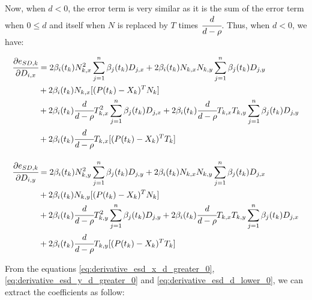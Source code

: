 \documentclass{article}
\begin{document}
Now, when $d < 0$, the error term is very similar as it is the sum of the error term when $0 \leq d$ and itself when $N$ is replaced by $T$ times $\cfrac{d}{d-\rho}$. Thus, when $d < 0$, we have:

\begin{equation}
\label{eq:derivative_esd_d_lower_0}
    \begin{aligned}
        \cfrac{\partial e_{SD,k}}{\partial D_{i,x}} 
        & = 2\beta_i(t_k)N_{k,x}^2 \sum \limits_{j=1}^{n} \beta_j(t_k)D_{j,x} 
        + 2\beta_i(t_k)N_{k,x}N_{k,y} \sum \limits_{j=1}^{n} \beta_j(t_k)D_{j,y} \\
        & + 2\beta_i(t_k)N_{k,x} [(P(t_k)-X_k)^T N_k] \\
        & + 2\beta_i(t_k) \cfrac{d}{d-\rho} T_{k,x}^2 \sum \limits_{j=1}^{n} \beta_j(t_k)D_{j,x} 
        + 2\beta_i(t_k) \cfrac{d}{d-\rho} T_{k,x}T_{k,y} \sum \limits_{j=1}^{n} \beta_j(t_k)D_{j,y} \\
        & + 2\beta_i(t_k) \cfrac{d}{d-\rho} T_{k,x} [(P(t_k)-X_k)^T T_k] 
        \\[10pt]
        \cfrac{\partial e_{SD,k}}{\partial D_{i,y}} 
        & = 2\beta_i(t_k)N_{k,y}^2 \sum \limits_{j=1}^{n} \beta_j(t_k)D_{j,y} 
        + 2\beta_i(t_k)N_{k,x}N_{k,y} \sum \limits_{j=1}^{n} \beta_j(t_k)D_{j,x} \\
        & + 2\beta_i(t_k)N_{k,y} [(P(t_k)-X_k)^T N_k] \\
        & + 2\beta_i(t_k) \cfrac{d}{d-\rho} T_{k,y}^2 \sum \limits_{j=1}^{n} \beta_j(t_k)D_{j,y} 
        + 2\beta_i(t_k) \cfrac{d}{d-\rho} T_{k,x}T_{k,y} \sum \limits_{j=1}^{n} \beta_j(t_k)D_{j,x} \\
        & + 2\beta_i(t_k) \cfrac{d}{d-\rho} T_{k,y} [(P(t_k)-X_k)^T T_k]
    \end{aligned}
\end{equation}

From the equations \ref{eq:derivative_esd_x_d_greater_0}, \ref{eq:derivative_esd_y_d_greater_0} and \ref{eq:derivative_esd_d_lower_0}, we can extract the coefficients as follow:
\end{document}
